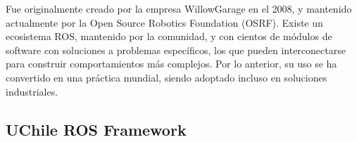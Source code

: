 Fue originalmente creado por la empresa WillowGarage en el 2008, y mantenido actualmente por la Open Source Robotics Foundation (OSRF). Existe un ecosistema ROS, mantenido por la comunidad, y con cientos de m\'odulos de software con soluciones a problemas espec\'ificos, los que pueden interconectarse para construir comportamientos m\'as complejos. Por lo anterior, su uso se ha convertido en una pr\'actica mundial, siendo adoptado incluso en soluciones industriales.


%
%
%
%
%







\subsection{UChile ROS Framework}

